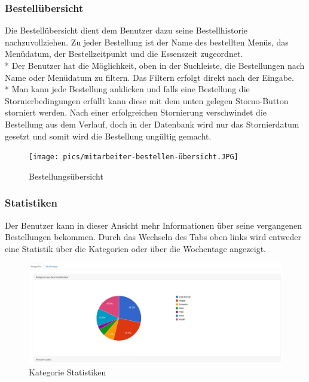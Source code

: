 \subsubsection {Bestellübersicht}

Die Bestellübersicht dient dem Benutzer dazu seine Bestellhistorie nachzuvollziehen. Zu jeder Bestellung ist der Name des bestellten Menüs, das Menüdatum, der Bestellzeitpunkt und die Essenszeit zugeordnet. \\*
Der Benutzer hat die Möglichkeit, oben in der Suchleiste, die Bestellungen nach Name oder Menüdatum zu filtern. Das Filtern erfolgt direkt nach der Eingabe. \\*
Man kann jede Bestellung anklicken und falls eine Bestellung die Stornierbedingungen erfüllt kann diese mit dem unten gelegen Storno-Button storniert werden.
Nach einer erfolgreichen Stornierung verschwindet die Bestellung aus dem Verlauf, doch in der Datenbank wird nur das Stornierdatum gesetzt und somit wird die Bestellung ungültig gemacht. 


\begin{figure}[htp]
    \centering
    \texttt{[image: pics/mitarbeiter-bestellen-übersicht.JPG]}
    \caption{Bestellungsübersicht}
    \label{fig:impl:BestellenMitarbeiterUebersicht}
\end{figure}
\pagebreak

\subsubsection {Statistiken}

Der Benutzer kann in dieser Ansicht mehr Informationen über seine vergangenen Bestellungen bekommen.
Durch das Wechseln des Tabs oben links wird entweder eine Statistik über die Kategorien oder über die Wochentage angezeigt.

\begin{figure}[htp]
    \centering
    \includegraphics[scale=0.3]{pics/statistiken_kategorien.JPG}
    \caption{Kategorie Statistiken}
    \label{fig:impl:StatsCategories}
\end{figure}

